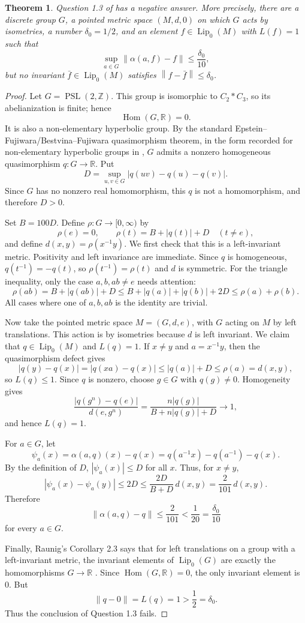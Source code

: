 \documentclass[11pt]{article}
\newtheorem{theorem}{Theorem}
\newcommand{\Lipz}{\operatorname{Lip}_0}
\newcommand{\PSL}{\operatorname{PSL}}
\newcommand{\Hom}{\operatorname{Hom}}
\newcommand{\norm}[1]{\left\|#1\right\|}
\newcommand{\abs}[1]{\left|#1\right|}
\begin{document}
\begin{theorem}
Question 1.3 of \cite{Raunig2025} has a negative answer.  More
precisely, there are a discrete group $G$, a pointed metric space
$(M,d,0)$ on which $G$ acts by isometries, a number $\delta_0=1/2$, and
an element $f\in \Lipz(M)$ with $L(f)=1$ such that
\[
  \sup_{a\in G}\norm{\alpha(a,f)-f}\leq \frac{\delta_0}{10},
\]
but no invariant $\bar f\in\Lipz(M)$ satisfies
$\norm{f-\bar f}\leq \delta_0$.
\end{theorem}

\begin{proof}
Let $G=\PSL(2,\mathbb Z)$.  This group is isomorphic to
$C_2*C_3$, so its abelianization is finite; hence
\[
  \Hom(G,\mathbb R)=0.
\]
It is also a non-elementary hyperbolic group.  By the standard
Epstein--Fujiwara/Bestvina--Fujiwara quasimorphism theorem, in the
form recorded for non-elementary hyperbolic groups in
\cite[Theorem B]{FournierFacioWade2023}, $G$ admits a nonzero
homogeneous quasimorphism $q:G\to\mathbb R$.  Put
\[
  D=\sup_{u,v\in G}\abs{q(uv)-q(u)-q(v)}.
\]
Since $G$ has no nonzero real homomorphism, this $q$ is not a
homomorphism, and therefore $D>0$.

Set $B=100D$.  Define $\rho:G\to[0,\infty)$ by
\[
  \rho(e)=0,\qquad
  \rho(t)=B+\abs{q(t)}+D \quad (t\neq e),
\]
and define $d(x,y)=\rho(x^{-1}y)$.  We first check that this is a
left-invariant metric.  Positivity and left invariance are immediate.
Since $q$ is homogeneous, $q(t^{-1})=-q(t)$, so $\rho(t^{-1})=\rho(t)$
and $d$ is symmetric.  For the triangle inequality, only the case
$a,b,ab\neq e$ needs attention:
\[
  \rho(ab)
   =B+\abs{q(ab)}+D
   \leq B+\abs{q(a)}+\abs{q(b)}+2D
   \leq \rho(a)+\rho(b).
\]
All cases where one of $a,b,ab$ is the identity are trivial.

Now take the pointed metric space $M=(G,d,e)$, with $G$ acting on $M$
by left translations.  This action is by isometries because $d$ is
left invariant.  We claim that $q\in\Lipz(M)$ and $L(q)=1$.  If
$x\neq y$ and $a=x^{-1}y$, then the quasimorphism defect gives
\[
  \abs{q(y)-q(x)}
  = \abs{q(xa)-q(x)}
  \leq \abs{q(a)}+D
  \leq \rho(a)
  =d(x,y),
\]
so $L(q)\leq 1$.  Since $q$ is nonzero, choose $g\in G$ with
$q(g)\neq 0$.  Homogeneity gives
\[
  \frac{\abs{q(g^n)-q(e)}}{d(e,g^n)}
   =\frac{n\abs{q(g)}}{B+n\abs{q(g)}+D}
   \longrightarrow 1,
\]
and hence $L(q)=1$.

For $a\in G$, let
\[
  \psi_a(x)=\alpha(a,q)(x)-q(x)
   =q(a^{-1}x)-q(a^{-1})-q(x).
\]
By the definition of $D$, $\abs{\psi_a(x)}\leq D$ for all $x$.
Thus, for $x\neq y$,
\[
  \abs{\psi_a(x)-\psi_a(y)}
  \leq 2D
  \leq \frac{2D}{B+D}\,d(x,y)
  =\frac{2}{101}\,d(x,y).
\]
Therefore
\[
  \norm{\alpha(a,q)-q}\leq \frac{2}{101}<\frac1{20}
  =\frac{\delta_0}{10}
\]
for every $a\in G$.

Finally, Raunig's Corollary 2.3 says that for left translations on a
group with a left-invariant metric, the invariant elements of
$\Lipz(G)$ are exactly the homomorphisms $G\to\mathbb R$
\cite[Corollary 2.3]{Raunig2025}.  Since $\Hom(G,\mathbb R)=0$, the
only invariant element is $0$.  But
\[
  \norm{q-0}=L(q)=1>\frac12=\delta_0.
\]
Thus the conclusion of Question 1.3 fails.
\end{proof}
\end{document}
